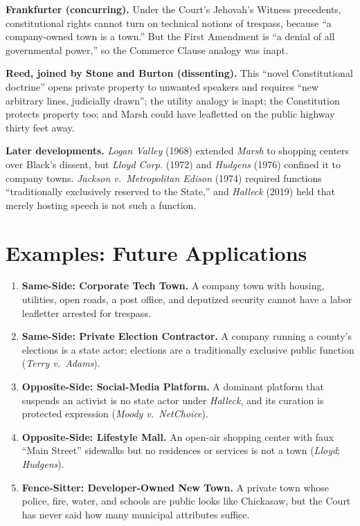 \documentclass[12pt]{article}
\begin{document}
\textbf{Frankfurter (concurring).} Under the Court's Jehovah's Witness precedents, constitutional rights cannot turn on technical notions of trespass, because ``a company-owned town is a town.'' But the First Amendment is ``a denial of all governmental power,'' so the Commerce Clause analogy was inapt.

\textbf{Reed, joined by Stone and Burton (dissenting).} This ``novel Constitutional doctrine'' opens private property to unwanted speakers and requires ``new arbitrary lines, judicially drawn''; the utility analogy is inapt; the Constitution protects property too; and Marsh could have leafletted on the public highway thirty feet away.

\textbf{Later developments.} \textit{Logan Valley} (1968) extended \textit{Marsh} to shopping centers over Black's dissent, but \textit{Lloyd Corp.} (1972) and \textit{Hudgens} (1976) confined it to company towns. \textit{Jackson v.\ Metropolitan Edison} (1974) required functions ``traditionally exclusively reserved to the State,'' and \textit{Halleck} (2019) held that merely hosting speech is not such a function.

\section{Examples: Future Applications}

\begin{enumerate}
\item \textbf{Same-Side: Corporate Tech Town.} A company town with housing, utilities, open roads, a post office, and deputized security cannot have a labor leafletter arrested for trespass.
\item \textbf{Same-Side: Private Election Contractor.} A company running a county's elections is a state actor; elections are a traditionally exclusive public function (\textit{Terry v.\ Adams}).
\item \textbf{Opposite-Side: Social-Media Platform.} A dominant platform that suspends an activist is no state actor under \textit{Halleck}, and its curation is protected expression (\textit{Moody v.\ NetChoice}).
\item \textbf{Opposite-Side: Lifestyle Mall.} An open-air shopping center with faux ``Main Street'' sidewalks but no residences or services is not a town (\textit{Lloyd}; \textit{Hudgens}).
\item \textbf{Fence-Sitter: Developer-Owned New Town.} A private town whose police, fire, water, and schools are public looks like Chickasaw, but the Court has never said how many municipal attributes suffice.
\end{enumerate}
\end{document}
